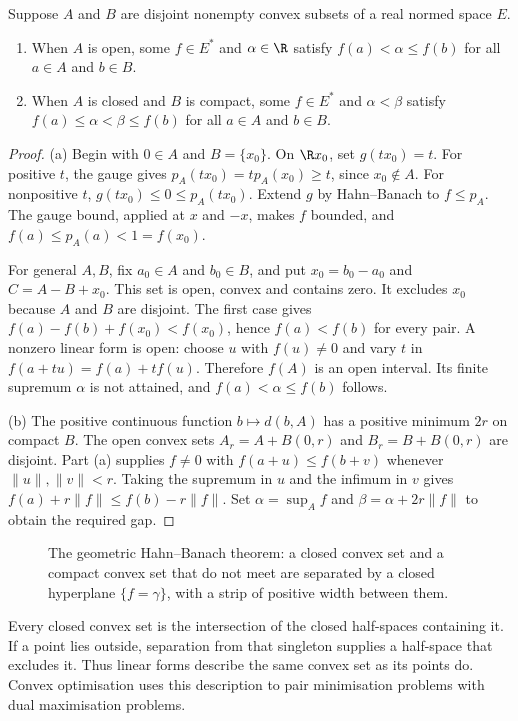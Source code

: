 \begin{theorem}\label{thm:separation}
Suppose $A$ and $B$ are disjoint nonempty convex subsets of a real normed space $E$.
\begin{enumerate}
\item[(a)] When $A$ is open, some $f\in E^*$ and $\alpha\in\R$ satisfy $f(a)<\alpha\le f(b)$ for all $a\in A$ and $b\in B$.
\item[(b)] When $A$ is closed and $B$ is compact, some $f\in E^*$ and $\alpha<\beta$ satisfy $f(a)\le\alpha<\beta\le f(b)$ for all $a\in A$ and $b\in B$.
\end{enumerate}
\end{theorem}
\begin{proof}
(a) Begin with $0\in A$ and $B=\{x_0\}$. On $\R x_0$, set $g(tx_0)=t$. For positive $t$, the gauge gives $p_A(tx_0)=tp_A(x_0)\ge t$, since $x_0\notin A$. For nonpositive $t$, $g(tx_0)\le0\le p_A(tx_0)$. Extend $g$ by Hahn--Banach to $f\le p_A$. The gauge bound, applied at $x$ and $-x$, makes $f$ bounded, and $f(a)\le p_A(a)<1=f(x_0)$.

For general $A,B$, fix $a_0\in A$ and $b_0\in B$, and put $x_0=b_0-a_0$ and $C=A-B+x_0$. This set is open, convex and contains zero. It excludes $x_0$ because $A$ and $B$ are disjoint. The first case gives $f(a)-f(b)+f(x_0)<f(x_0)$, hence $f(a)<f(b)$ for every pair. A nonzero linear form is open: choose $u$ with $f(u)\ne0$ and vary $t$ in $f(a+tu)=f(a)+tf(u)$. Therefore $f(A)$ is an open interval. Its finite supremum $\alpha$ is not attained, and $f(a)<\alpha\le f(b)$ follows.

(b) The positive continuous function $b\mapsto d(b,A)$ has a positive minimum $2r$ on compact $B$. The open convex sets $A_r=A+B(0,r)$ and $B_r=B+B(0,r)$ are disjoint. Part (a) supplies $f\ne0$ with $f(a+u)\le f(b+v)$ whenever $\|u\|,\|v\|<r$. Taking the supremum in $u$ and the infimum in $v$ gives $f(a)+r\|f\|\le f(b)-r\|f\|$. Set $\alpha=\sup_Af$ and $\beta=\alpha+2r\|f\|$ to obtain the required gap.
\end{proof}

\begin{figure}[ht]
\centering
{}
\caption{The geometric Hahn--Banach theorem: a closed convex set and a compact convex set that do not meet are separated by a closed hyperplane $\{f=\gamma\}$, with a strip of positive width between them.}
\label{fig:separation}
\end{figure}

\begin{beauty}
Every closed convex set is the intersection of the closed half-spaces containing it. If a point lies outside, separation from that singleton supplies a half-space that excludes it. Thus linear forms describe the same convex set as its points do. Convex optimisation uses this description to pair minimisation problems with dual maximisation problems.
\end{beauty}

